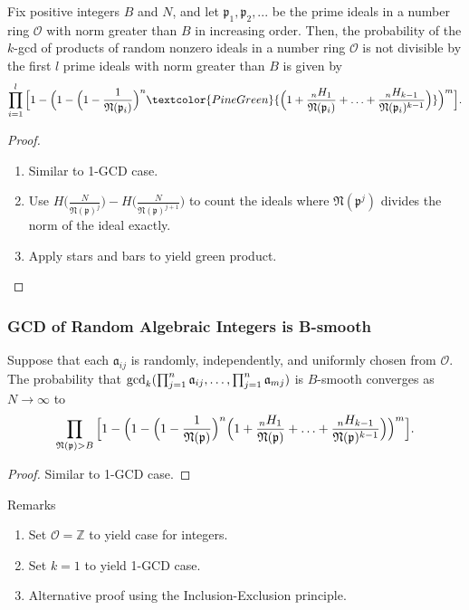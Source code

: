 \documentclass[11pt,xcolor={dvipsnames}]{beamer}
\newcommand{\f}[1]{\mathfrak{#1}}
\begin{document}
\begin{frame}
	\begin{theorem}
		Fix positive integers $B$ and $N$, and let $\f{p}_1, \f{p}_2, ...$ be the prime ideals in a number ring $\mathcal{O}$ with norm greater than $B$ in increasing order. Then, the probability of the $k$-gcd of products of random nonzero ideals in a number ring $\mathcal{O}$ is not divisible by the first $l$ prime ideals with norm greater than $B$ is given by 
		$$\prod_{i=1}^{l} \Big[1 - \Big(1 - \Big(1-\frac{1}{\mathfrak{N}(\f{p}_i)}\Big)^n \textcolor{PineGreen}{\Big(1+\frac{{}_nH_1}{\f{N}(\f{p}_i)}+\mathellipsis+\frac{{}_nH_{k-1}}{\f{N}(\f{p}_i)^{k-1}}\Big)}\Big)^m\Big].$$
	\end{theorem}
	
	\begin{proof}
		\begin{enumerate}
			\item Similar to 1-GCD case.
			\item Use $H\bigg(\frac{N}{\f{N}(\f{p})^j}\bigg) - H\bigg(\frac{N}{\f{N}(\f{p})^{j+1}}\bigg)$ to count the ideals where $\f{N}(\f{p}^j)$ divides the norm of the ideal exactly.
			\item Apply stars and bars to yield \textcolor{PineGreen}{green product.}
		\end{enumerate}
	\end{proof}
\end{frame}

\begin{frame}
	\begin{theorem}
		\frametitle{GCD of Random Algebraic Integers is B-smooth}
		Suppose that each $\f{a}_{ij}$ is randomly, independently, and uniformly chosen from $\mathcal{O}$. The probability that $\gcd_k(\prod_{j=1}^{n}\f{a}_{ij},\mathellipsis,\prod_{j=1}^{n}\f{a}_{mj})$ is $B$-smooth converges as $N\to\infty$ to $$\prod_{\f{N}(\f{p})>B} \Big[1 - \Big(1 -\Big(1-\frac{1}{\f{N}(\f{p})}\Big)^n\Big(1+\frac{{}_nH_1}{\f{N}(\f{p})}+\mathellipsis+\frac{{}_nH_{k-1}}{\f{N}(\f{p})^{k-1}}\Big)\Big)^m\Big].$$
	\end{theorem}
	
	\begin{proof}
		Similar to 1-GCD case. 
	\end{proof}
	
	\begin{alertblock}{Remarks}
		\begin{enumerate}
			\item Set $\mathcal{O}=\mathbb{Z}$ to yield case for integers.
			\item Set $k=1$ to yield 1-GCD case.
			\item Alternative proof using the Inclusion-Exclusion principle.
		\end{enumerate}
	\end{alertblock}
\end{frame}
\end{document}
